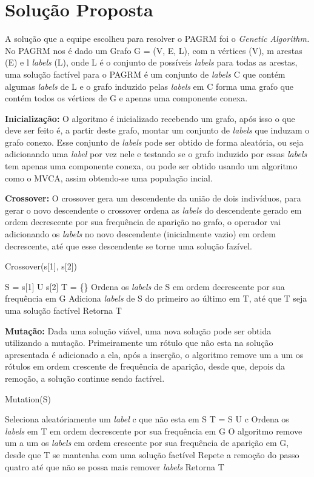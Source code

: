 \documentclass[12pt]{article}
\begin{document}
	\section{Solução Proposta}\label{sec:solucaoProposta}

	A solução que a equipe escolheu para resolver o PAGRM foi o \textit{Genetic Algorithm.}
	No PAGRM nos é dado um Grafo G = (V, E, L), com n vértices (V), m arestas (E) e l \textit{labels} (L), onde L é o conjunto de possíveis \textit{labels} para todas as arestas, uma solução factível para o PAGRM é um conjunto de \textit{labels} C que contém algumas \textit{labels} de L e o grafo induzido pelas \textit{labels} em C forma uma grafo que contém todos os vértices de G e apenas uma componente conexa.

	\textbf{Inicialização:} O algoritmo é inicializado recebendo um grafo, após isso o que deve ser feito é, a partir deste grafo, montar um conjunto de \textit{labels} que induzam o grafo conexo. Esse conjunto de \textit{labels} pode ser obtido de forma aleatória, ou seja adicionando uma \textit{label} por vez nele e testando se o grafo  induzido por essas \textit{labels} tem apenas uma componente conexa, ou pode ser obtido usando um algoritmo como o MVCA, assim obtendo-se uma população incial.

	\textbf{Crossover:} O crossover gera um descendente da união de dois indivíduos, para gerar o novo descendente o crossover ordena as \textit{labels} do descendente gerado em ordem decrescente por sua frequência de aparição no grafo, o operador vai adicionando os \textit{labels} no novo descendente (inicialmente vazio) em ordem decrescente, até que esse descendente se torne uma solução fazível.

		\begin{algorithm}[H]
		\caption{Crossover(s[1], s[2])}
		S = s[1] U s[2]\;
		T = \{\}\;
		Ordena os \textit{labels} de S em ordem decrescente por sua frequência em G\;
		Adiciona \textit{labels} de S do primeiro ao último em T, até que T seja uma solução factível\;
		Retorna T\;
	\end{algorithm}

	\textbf{Mutação:} Dada uma solução viável, uma nova solução pode ser obtida utilizando a mutação. Primeiramente um rótulo que não esta na solução apresentada é adicionado a ela, após a inserção, o algoritmo remove um a um os rótulos em ordem crescente de frequência de aparição, desde que, depois da remoção, a solução continue sendo factível.

	\begin{algorithm}[H]
		\caption{Mutation(S)}
		Seleciona aleatóriamente um \textit{label} c que não esta em S\;
		T =  S U {c}\;
		Ordena os \textit{labels} em T em ordem decrescente por sua frequência em G\;
		O algoritmo remove um a um os \textit{labels} em ordem crescente por sua frequência de aparição em G, desde que T se mantenha com uma solução factível\;
		Repete a remoção do passo quatro até que não se possa mais remover \textit{labels} \;
		Retorna T\;
	\end{algorithm}
\end{document}
